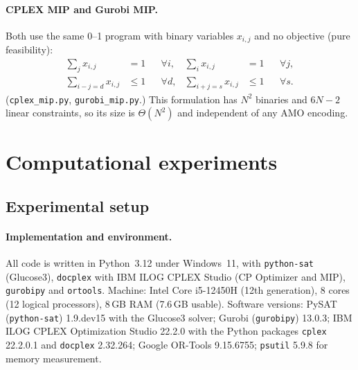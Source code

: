 \documentclass[a4paper,fleqn]{cas-sc}
\begin{document}
\paragraph{CPLEX MIP and Gurobi MIP.}
Both use the same 0--1 program with binary variables $x_{i,j}$ and no objective (pure feasibility):
\begin{align}
 \textstyle\sum_{j} x_{i,j}&=1 &&\forall i, &
 \textstyle\sum_{i} x_{i,j}&=1 &&\forall j,\\
 \textstyle\sum_{i-j=d} x_{i,j}&\le1 &&\forall d, &
 \textstyle\sum_{i+j=s} x_{i,j}&\le1 &&\forall s.
\end{align}
(\texttt{cplex\_mip.py}, \texttt{gurobi\_mip.py}.)
This formulation has $N^2$ binaries and $6N-2$ linear constraints, so its size is $\Theta(N^2)$ and independent of any AMO encoding.

\FloatBarrier
\section{Computational experiments}\label{sec:experiments}

\subsection{Experimental setup}
\paragraph{Implementation and environment.}
All code is written in Python~3.12 under Windows~11, with \texttt{python-sat} (Glucose3), \texttt{docplex} with IBM ILOG CPLEX Studio (CP Optimizer and MIP), \texttt{gurobipy} and \texttt{ortools}.
Machine: Intel Core i5-12450H (12th generation), 8 cores (12 logical processors), 8\,GB RAM (7.6\,GB usable).
Software versions: PySAT (\texttt{python-sat}) 1.9.dev15 with the Glucose3 solver; Gurobi (\texttt{gurobipy}) 13.0.3; IBM ILOG CPLEX Optimization Studio 22.2.0 with the Python packages \texttt{cplex} 22.2.0.1 and \texttt{docplex} 2.32.264; Google OR-Tools 9.15.6755; \texttt{psutil} 5.9.8 for memory measurement.
\end{document}
